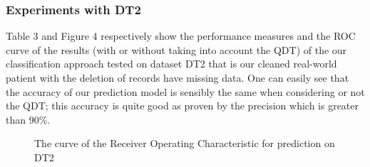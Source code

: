 \subsubsection{Experiments with DT2}
Table 3 and Figure 4 respectively show the performance measures and the ROC curve of the results (with or without taking into account the QDT) 
of the our classification approach tested on dataset DT2 that is our cleaned real-world patient with the deletion of records have missing data.
One can easily see that the accuracy of our prediction model is sensibly the same when considering or not the QDT; this accuracy is quite good as proven by the precision which is greater than 90\%.



\begin{table}[!h]
\centering
{}%
\hspace*{0.5cm}
%
\label{perf-measure-dt2}\caption{Performance measures of the prediction on DT2}
\end{table}

\begin{figure}[!h]
\centering
{}%
\caption{The curve of the Receiver Operating Characteristic for prediction on DT2}\label{curve_roc_dt2}
\end{figure}

